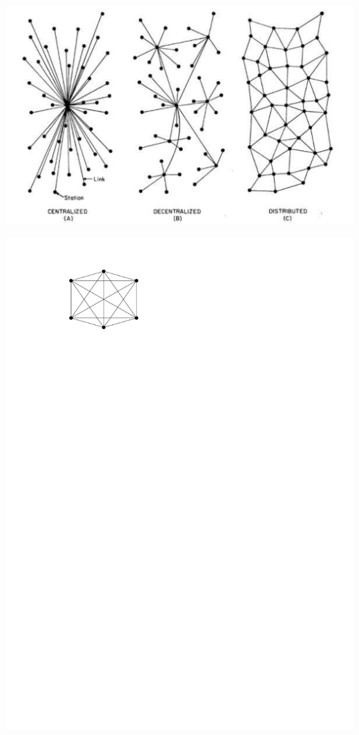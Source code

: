 \documentclass[usenames,dvipsnames,9pt]{beamer}
\begin{document}
\begin{frame}
\begin{center}
\includegraphics[width=.9\linewidth]{09/figs/ds.jpeg}
\end{center}
\end{frame}

\begin{frame}
\begin{center}
  \includegraphics[width=0.4\linewidth]{09/figs/complete.pdf}
\end{center}
\end{frame}
\end{document}

